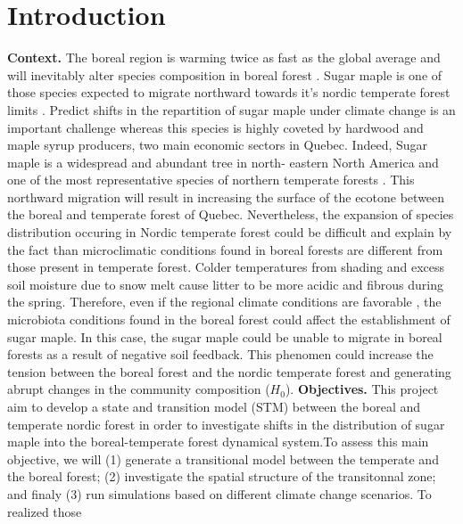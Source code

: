 


\newpage
\setcounter{page}{1}

\section{Introduction}

\textbf{Context.}  The boreal region is warming twice as fast as the global
average and will inevitably alter species composition in boreal forest
\cite{Scheffer2012,Hughes2000}.  Sugar maple is one of those species expected to
migrate northward towards it's nordic temperate forest limits
\cite{McKENNEY2007,Goldblum2005}. Predict shifts in the repartition of sugar
maple under climate change is an important challenge whereas this species is
highly coveted by hardwood and maple syrup producers, two main economic sectors
in Quebec. Indeed, Sugar maple is a widespread and abundant tree in north-
eastern North America and one of the most representative species of northern
temperate forests \cite{Graignic2013,Messaoud2007,Kellman2004}. This northward
migration will result in increasing the surface of the ecotone between the
boreal and temperate forest of Quebec. Nevertheless, the expansion of species
distribution occuring in Nordic temperate forest could be difficult and explain
by the fact than microclimatic conditions found in boreal forests are different
from those present in temperate forest. Colder temperatures from shading and
excess soil moisture due to snow melt cause litter to be more acidic and fibrous
during the spring. Therefore, even if the regional climate conditions are
favorable \cite{Kellman2004}, the microbiota conditions found in the boreal
forest could affect the establishment of sugar
maple\cite{Kellman2004,Moore2008,DeFrenne2013}. In this case, the sugar maple
could be unable to migrate in boreal forests as a result of negative soil
feedback. This phenomen could increase the tension between the boreal forest and
the nordic temperate forest and generating abrupt changes in the community
composition (\textbf{$H_0$}). \textbf{Objectives.} This project aim to develop a
state and transition model (STM) between the boreal and temperate nordic forest
in order to investigate shifts in the distribution of sugar maple into the
boreal-temperate forest dynamical system.To assess this main objective, we will
(1) generate a transitional model between the temperate and the boreal forest;
(2) investigate the spatial structure of the transitonnal zone; and finaly (3)
run simulations based on different climate change scenarios. To realized those
